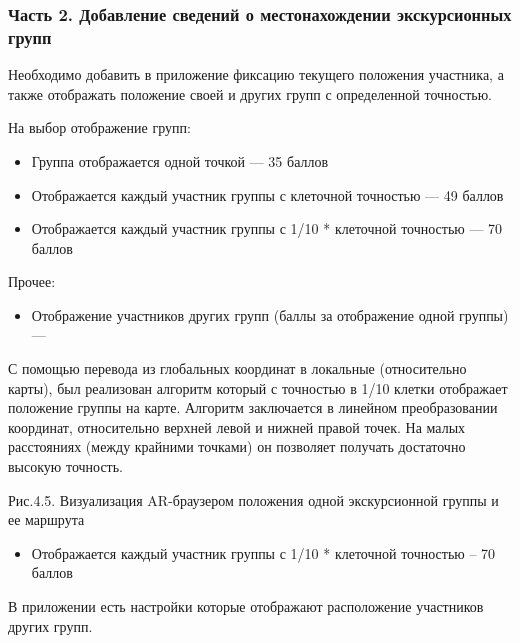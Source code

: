 \subsubsection*{Часть 2.  Добавление сведений о местонахождении экскурсионных групп}

Необходимо добавить в приложение фиксацию текущего положения участника, а также отображать положение своей и других групп с определенной точностью.

\markSection

На выбор отображение групп:
\begin{itemize}
\item Группа отображается одной точкой — 35 баллов
\item Отображается каждый участник группы с клеточной точностью — 49 баллов
\item Отображается каждый участник группы с 1/10 * клеточной точностью — 70 баллов
\end{itemize}

Прочее:
\begin{itemize}
    \item Отображение участников других групп (баллы за отображение одной группы) — 
\end{itemize}

\solutionSection

С помощью перевода из глобальных координат в локальные (относительно карты), был реализован алгоритм который с точностью в 1/10 клетки отображает положение группы на карте. Алгоритм заключается в линейном преобразовании координат, относительно верхней левой и нижней правой точек. На малых расстояниях (между крайними точками) он позволяет получать достаточно высокую точность.


\begin{center}
Рис.4.5. Визуализация AR-браузером положения одной экскурсионной группы и ее маршрута
\end{center}

\markSection

\begin{itemize}
\item Отображается каждый участник группы с 1/10 * клеточной точностью – 70 баллов
\end{itemize}

В приложении есть настройки которые отображают расположение участников других групп.


